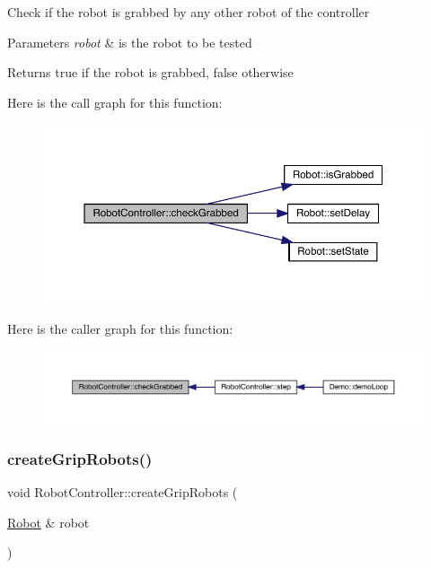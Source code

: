 Check if the robot is grabbed by any other robot of the controller 
\begin{DoxyParams}{Parameters}
{\em robot} & is the robot to be tested \\
\hline
\end{DoxyParams}
\begin{DoxyReturn}{Returns}
true if the robot is grabbed, false otherwise 
\end{DoxyReturn}
Here is the call graph for this function\+:\nopagebreak
\begin{figure}[H]
\begin{center}
\leavevmode
\includegraphics[width=350pt]{class_robot_controller_a69372797c97d6f9212dc63d2b35b4932_cgraph}
\end{center}
\end{figure}
Here is the caller graph for this function\+:\nopagebreak
\begin{figure}[H]
\begin{center}
\leavevmode
\includegraphics[width=350pt]{class_robot_controller_a69372797c97d6f9212dc63d2b35b4932_icgraph}
\end{center}
\end{figure}
\mbox{\label{class_robot_controller_a6b0bdb7620acbf40f48426e30ff0b759}} 
\subsubsection{\texorpdfstring{create\+Grip\+Robots()}{createGripRobots()}}
{\footnotesize\ttfamily void Robot\+Controller\+::create\+Grip\+Robots (\begin{DoxyParamCaption}\item[{\mbox{\hyperlink{class_robot}{Robot}} \&}]{robot }\end{DoxyParamCaption})}

